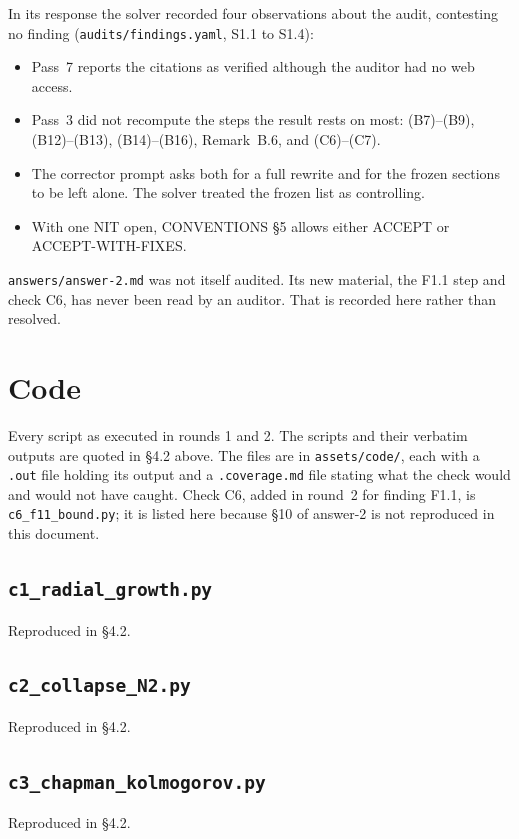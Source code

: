 \documentclass[11pt,a4paper]{article}
\begin{document}
In its response the solver recorded four observations about the audit, contesting
no finding (\texttt{audits/findings.yaml}, S1.1 to S1.4):
\begin{itemize}
\item Pass~7 reports the citations as verified although the auditor had no web
access.
\item Pass~3 did not recompute the steps the result rests on most: (B7)--(B9),
(B12)--(B13), (B14)--(B16), Remark~B.6, and (C6)--(C7).
\item The corrector prompt asks both for a full rewrite and for the frozen sections
to be left alone. The solver treated the frozen list as controlling.
\item With one NIT open, CONVENTIONS \S5 allows either ACCEPT or ACCEPT-WITH-FIXES.
\end{itemize}

\texttt{answers/answer-2.md} was not itself audited. Its new material, the F1.1
step and check C6, has never been read by an auditor. That is recorded here rather
than resolved.

\section{Code}\label{app:code}
Every script as executed in rounds 1 and 2. The scripts and their verbatim outputs are quoted in \S4.2 above. The files are in \texttt{assets/code/}, each with a \texttt{.out} file holding its output and a \texttt{.coverage.md} file stating what the check would and would not have caught. Check C6, added in round~2 for finding F1.1, is \texttt{c6\_f11\_bound.py}; it is listed here because \S10 of answer-2 is not reproduced in this document.

\subsection{\texttt{c1\_radial\_growth.py}}
Reproduced in \S4.2.

\subsection{\texttt{c2\_collapse\_N2.py}}
Reproduced in \S4.2.

\subsection{\texttt{c3\_chapman\_kolmogorov.py}}
Reproduced in \S4.2.
\end{document}
